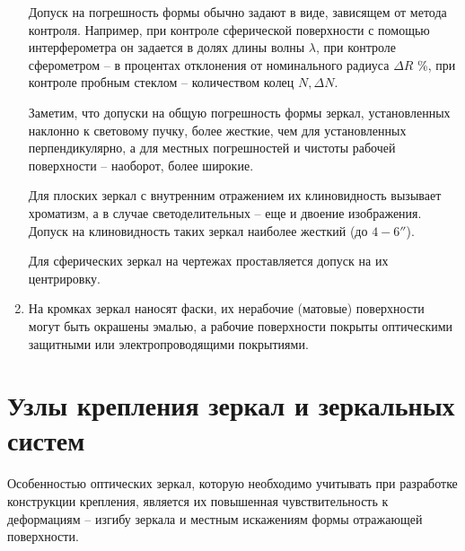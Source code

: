 \begin{enumerate}[leftmargin=*]
Допуск на погрешность формы обычно задают в виде, зависящем от метода контроля. Например, при контроле сферической поверхности с помощью интерферометра он задается в долях длины волны $ \lambda $, при контроле сферометром -- в процентах отклонения от номинального радиуса $ \Delta R $ \%, при контроле пробным стеклом -- количеством колец $ N, \Delta N $.

Заметим, что допуски на общую погрешность формы зеркал, установленных наклонно к световому пучку, более жесткие, чем для установленных перпендикулярно, а для местных погрешностей и чистоты рабочей поверхности -- наоборот, более широкие.

Для плоских зеркал с внутренним отражением их клиновидность вызывает хроматизм, а в случае светоделительных -- еще и двоение изображения. Допуск на клиновидность таких зеркал наиболее жесткий (до $ 4-6'' $).

Для сферических зеркал на чертежах проставляется допуск на их центрировку.

\item На кромках зеркал наносят фаски, их нерабочие (матовые) поверхности могут быть окрашены эмалью, а рабочие поверхности покрыты оптическими защитными или электропроводящими покрытиями.
\end{enumerate}


\section{Узлы крепления зеркал и зеркальных систем}

Особенностью оптических зеркал, которую необходимо учитывать при разработке конструкции крепления, является их повышенная чувствительность к деформациям -- изгибу зеркала и местным искажениям формы отражающей поверхности. 

